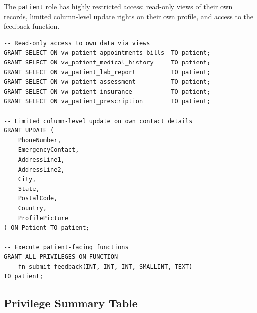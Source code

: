 \documentclass{article}
\begin{document}
The \texttt{patient} role has highly restricted access: read-only views of their own records, limited column-level update rights on their own profile, and access to the feedback function.
 
\begin{lstlisting}
-- Read-only access to own data via views
GRANT SELECT ON vw_patient_appointments_bills  TO patient;
GRANT SELECT ON vw_patient_medical_history     TO patient;
GRANT SELECT ON vw_patient_lab_report          TO patient;
GRANT SELECT ON vw_patient_assessment          TO patient;
GRANT SELECT ON vw_patient_insurance           TO patient;
GRANT SELECT ON vw_patient_prescription        TO patient;
 
-- Limited column-level update on own contact details
GRANT UPDATE (
    PhoneNumber,
    EmergencyContact,
    AddressLine1,
    AddressLine2,
    City,
    State,
    PostalCode,
    Country,
    ProfilePicture
) ON Patient TO patient;
 
-- Execute patient-facing functions
GRANT ALL PRIVILEGES ON FUNCTION
    fn_submit_feedback(INT, INT, INT, SMALLINT, TEXT)
TO patient;
\end{lstlisting}
 
\subsection{Privilege Summary Table}
 
\end{document}
